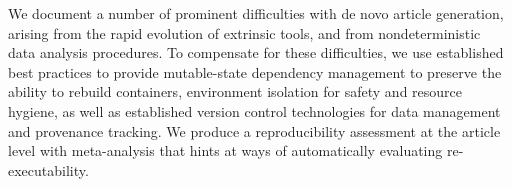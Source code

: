 We document a number of prominent difficulties with de novo article generation, arising from the rapid evolution of extrinsic tools, and from nondeterministic data analysis procedures.
To compensate for these difficulties, we use established best practices to provide mutable-state dependency management to preserve the ability to rebuild containers, environment isolation for safety and resource hygiene, as well as established version control technologies for data management and provenance tracking.
We produce a reproducibility assessment at the article level with meta-analysis that hints at ways of automatically evaluating re-executability.

